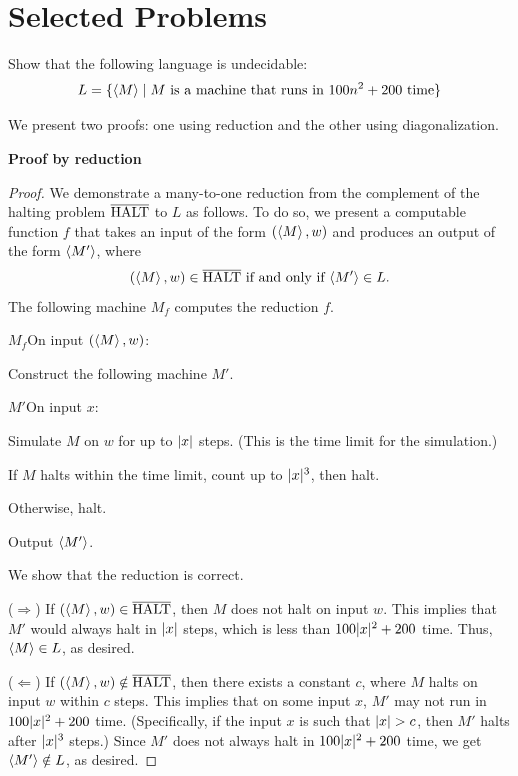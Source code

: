   \section{Selected Problems}
  \begin{problem}
    Show that the following language is undecidable:
    \[ L = \{ \left< M \right> \mid \text{$M$ is a machine that runs in $100 n^2 + 200$ time} \} \]
    \begin{sol}
      We present two proofs: one using reduction and the other using diagonalization.

      \textbf{Proof by reduction}

      \begin{proof}
        We demonstrate a many-to-one reduction from the complement of the halting problem $\overline{\text{HALT}}$ to $L$ as follows. To do so, we present a computable function $f$ that takes an input of the form $(\left< M \right>, w)$ and produces an output of the form $\left< M' \right>$, where
        \[ \text{$(\left< M \right>, w) \in \overline{\text{HALT}}$ if and only if $\left< M' \right> \in L$.} \]
        The following machine $M_f$ computes the reduction $f$.
        \begin{turing}{$M_f$}{On input $(\left< M \right>, w)$:}
        \item Construct the following machine $M'$.
          \begin{turing}{$M'$}{On input $x$:}
          \item Simulate $M$ on $w$ for up to $| x |$ steps. (This is the time limit for the simulation.)
          \item If $M$ halts within the time limit, count up to $| x |^3$, then halt.
          \item Otherwise, halt.
          \end{turing}
        \item Output $\left< M' \right>$.
        \end{turing}

        We show that the reduction is correct.

        ($\Rightarrow$) If $(\left< M \right>, w) \in \overline{\text{HALT}}$, then $M$ does not halt on input $w$. This implies that $M'$ would always halt in $| x |$ steps, which is less than $100 | x |^2 + 200$ time. Thus, $\left< M \right> \in L$, as desired.

        ($\Leftarrow$) If $(\left< M \right>, w) \notin \overline{\text{HALT}}$, then there exists a constant $c$, where $M$ halts on input $w$ within $c$ steps. This implies that on some input $x$, $M'$ may not run in $100 | x |^2 + 200$ time. (Specifically, if the input $x$ is such that $| x | > c$, then $M'$ halts after $| x |^3$ steps.) Since $M'$ does not always halt in $100 | x |^2 + 200$ time, we get $\left< M' \right> \notin L$, as desired.


\end{proof}
\end{sol}
\end{problem}
